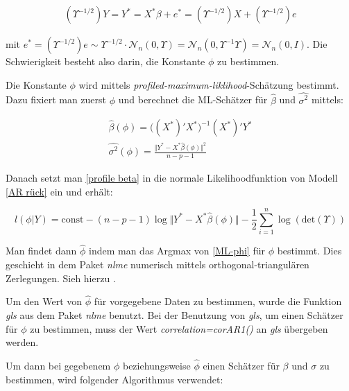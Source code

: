 \documentclass[12pt,a4paper]{article}
\theoremstyle{definition}
\theoremstyle{definition}
\theoremstyle{definition}
\theoremstyle{definition}
\begin{document}
\begin{align} \label{AR rück}
(\Upsilon^{-1/2})Y = Y^{*} = X^{*} \beta + e^{*} = (\Upsilon^{-1/2})X + (\Upsilon^{-1/2})e
\end{align}

mit $e^{*} = (\Upsilon^{-1/2})e \sim \Upsilon^{-1/2} \cdot \mathscr{N}_{n}(0,\Upsilon) = \mathscr{N}_{n}(0,\Upsilon^{-1}\Upsilon) = \mathscr{N}_{n}(0,I)$. Die Schwierigkeit besteht also darin, die Konstante $\phi$ zu bestimmen. 

Die Konstante $\phi$ wird mittels \textit{profiled-maximum-liklihood}-Schätzung bestimmt. Dazu fixiert man zuerst $\phi$ und berechnet die ML-Schätzer für $\hat{\beta}$ und $\widehat{\sigma^2}$ mittels:

\begin{eqnarray}
\label{profile beta}
\hat{\beta}(\phi) =  \big( (X^*)' X^* \big)^{-1} (X^*)' Y^* \\
\widehat{\sigma^2}(\phi) = \frac{\Vert Y^* - X^* \hat{\beta}(\phi) \Vert^2}{n-p-1} \nonumber
\end{eqnarray}

Danach setzt man \eqref{profile beta} in die normale Likelihoodfunktion von Modell \eqref{AR rück} ein und erhält:

\begin{equation}\label{ML-phi}
l(\phi|Y) = \text{const} - (n-p-1) \log \Vert Y^* - X^* \hat{\beta}(\phi) \Vert - \frac{1}{2} \sum^n_{i=1} \log( \text{det} (\Upsilon) )
\end{equation}

Man findet dann $\hat{\phi}$ indem man das Argmax von \eqref{ML-phi} für $\phi$ bestimmt. Dies geschieht in dem Paket \textit{nlme} numerisch mittels orthogonal-triangulären Zerlegungen. Sieh hierzu \cite[68-75]{Pinheiro00}.

Um den Wert von $\hat{\phi}$ für vorgegebene Daten zu bestimmen, wurde die Funktion \textit{gls} aus dem Paket \textit{nlme} benutzt. Bei der Benutzung von \textit{gls}, um einen Schätzer für $\phi$ zu bestimmen, muss der Wert \textit{correlation=corAR1()} an \textit{gls} übergeben werden.

Um dann bei gegebenem $\phi$ beziehungsweise $\hat{\phi}$ einen Schätzer für $\beta$ und $\sigma$ zu bestimmen, wird folgender Algorithmus verwendet:
\end{document}
